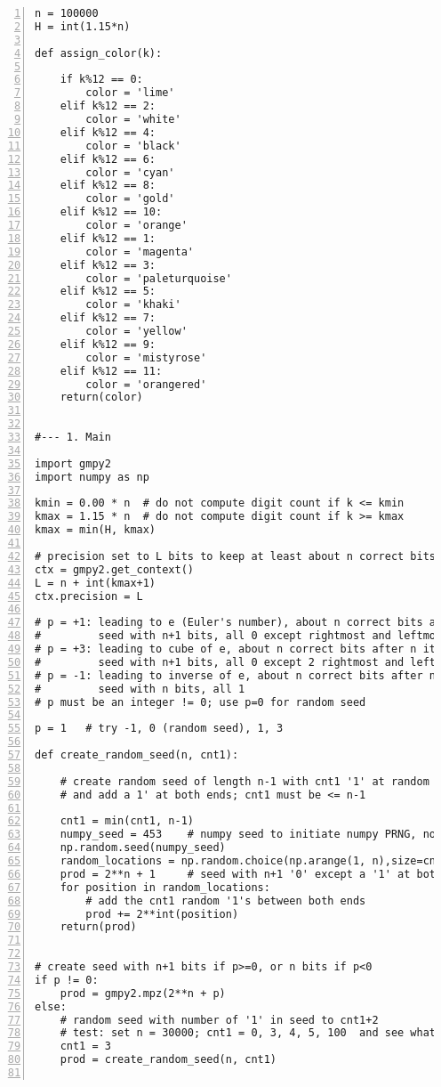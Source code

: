\documentclass[10pt]{article}
\begin{document}
\begin{lstlisting}[numbers=left]
n = 100000 
H = int(1.15*n)  

def assign_color(k):

    if k%12 == 0:
        color = 'lime'
    elif k%12 == 2:
        color = 'white' 
    elif k%12 == 4:
        color = 'black'
    elif k%12 == 6:
        color = 'cyan'
    elif k%12 == 8:
        color = 'gold'
    elif k%12 == 10:
        color = 'orange'
    elif k%12 == 1:
        color = 'magenta'
    elif k%12 == 3:
        color = 'paleturquoise'
    elif k%12 == 5: 
        color = 'khaki'
    elif k%12 == 7:
        color = 'yellow'
    elif k%12 == 9:
        color = 'mistyrose'
    elif k%12 == 11:
        color = 'orangered'
    return(color)


#--- 1. Main

import gmpy2
import numpy as np

kmin = 0.00 * n  # do not compute digit count if k <= kmin
kmax = 1.15 * n  # do not compute digit count if k >= kmax
kmax = min(H, kmax)

# precision set to L bits to keep at least about n correct bits till k=kmax
ctx = gmpy2.get_context()  
L = n + int(kmax+1)
ctx.precision = L     

# p = +1: leading to e (Euler's number), about n correct bits after n iter
#         seed with n+1 bits, all 0 except rightmost and leftmost
# p = +3: leading to cube of e, about n correct bits after n iter
#         seed with n+1 bits, all 0 except 2 rightmost and leftmost
# p = -1: leading to inverse of e, about n correct bits after n iter
#         seed with n bits, all 1
# p must be an integer != 0; use p=0 for random seed

p = 1   # try -1, 0 (random seed), 1, 3 

def create_random_seed(n, cnt1):

    # create random seed of length n-1 with cnt1 '1' at random locations
    # and add a 1' at both ends; cnt1 must be <= n-1
 
    cnt1 = min(cnt1, n-1)
    numpy_seed = 453    # numpy seed to initiate numpy PRNG, not the model seed
    np.random.seed(numpy_seed)
    random_locations = np.random.choice(np.arange(1, n),size=cnt1,replace=False)
    prod = 2**n + 1     # seed with n+1 '0' except a '1' at both ends
    for position in random_locations:
        # add the cnt1 random '1's between both ends
        prod += 2**int(position)
    return(prod)


# create seed with n+1 bits if p>=0, or n bits if p<0
if p != 0:
    prod = gmpy2.mpz(2**n + p)           
else:
    # random seed with number of '1' in seed to cnt1+2
    # test: set n = 30000; cnt1 = 0, 3, 4, 5, 100  and see what happens!
    cnt1 = 3  
    prod = create_random_seed(n, cnt1)  


\end{lstlisting}
\end{document}
